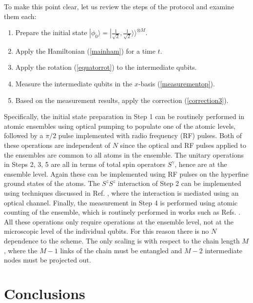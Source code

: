 \documentclass[12pt]{iopart}
\begin{document}
To make this point clear, let us review the steps of the protocol and examine them each:
%
\begin{enumerate}
\item Prepare the initial state $ | \phi_0 \rangle = |\frac{1}{\sqrt{2}}, \frac{1}{\sqrt{2}} \rangle \rangle^{\otimes M} $. 
\item Apply the Hamiltonian (\ref{mainham}) for a time $ t $. 
\item Apply the rotation (\ref{equatorrot}) to the intermediate qubits. 
\item Measure the intermediate qubits in the $ x $-basis (\ref{measurementop}). 
\item Based on the measurement results, apply the correction (\ref{correction3}).  
\end{enumerate}
%
Specifically, the initial state preparation in Step 1 can be routinely performed in atomic ensembles using optical pumping to populate one of the atomic levels, followed by a $ \pi/2 $ pulse implemented with radio frequency (RF) pulses. Both of these operations are independent of $ N $ since the optical and RF pulses applied to the ensembles are common to all atoms in the ensemble.  The unitary operations in Steps 2, 3, 5 are all in terms of total spin operators $ S^\gamma $, hence are at the ensemble level. Again these can be implemented using RF pulses on the hyperfine ground states of the atoms.  The $ S^z S^z $ interaction of Step 2 can be implemented using techniques discussed in Ref. \cite{pyrkov2013entanglement,hussain2014geometric}, where the interaction is mediated using an optical channel.  Finally, the measurement in Step 4 is performed using atomic counting of the ensemble, which is routinely performed in works such as Refs. \cite{Hume2013,Ott2016,Qu2020}.  All these operations only require operations at the ensemble level, not at the microscopic level of the individual qubits.  For this reason there is no $ N $ dependence to the scheme.  The only scaling is with respect to the chain length $ M $, where the $ M - 1 $ links of the chain must be entangled and $ M - 2$ intermediate nodes must be projected out.  
















\section{Conclusions}
\end{document}
